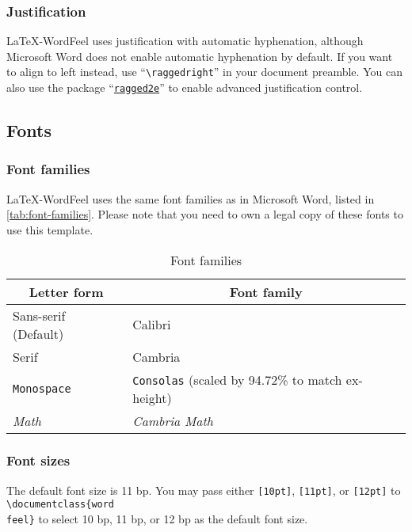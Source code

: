 \documentclass[letterpaper]{wordfeel}
\begin{document}
\subsubsection{Justification}

\LaTeX-WordFeel uses justification with automatic hyphenation, although Microsoft Word does not enable automatic hyphenation by default. If you want to align to left instead, use ``\texttt{\textbackslash{}raggedright}'' in your document preamble. You can also use the package ``\href{https://ctan.org/pkg/ragged2e}{\texttt{ragged2e}}'' to enable advanced justification control.

\subsection{Fonts}

\subsubsection{Font families}

\FloatBarrier

\LaTeX-WordFeel uses the same font families as in Microsoft Word, listed in \autoref{tab:font-families}. Please note that you need to own a legal copy of these fonts to use this template.

\begin{table}[htb]
    \centering
    \caption{Font families}
    \label{tab:font-families}
    \begin{tabular}{ll}
        \toprule
        \multicolumn{1}{c}{Letter form} & \multicolumn{1}{c}{Font family} \\
        \midrule
        \textsf{Sans-serif (Default)} & \textsf{Calibri} \\
        Serif & \textrm{Cambria} \\
        \texttt{Monospace} & \texttt{Consolas} (scaled by 94.72\% to match ex-height) \\
        \textrm{\textit{Math}} & \textrm{\textit{Cambria Math}} \\
        \bottomrule
    \end{tabular}
\end{table}

\FloatBarrier

\subsubsection{Font sizes}

The default font size is 11 bp. You may pass either \texttt{[10pt]}, \texttt{[11pt]}, or \texttt{[12pt]} to \texttt{\textbackslash{}documentclass\{word\\feel\}} to select 10 bp, 11 bp, or 12 bp as the default font size.
\end{document}
